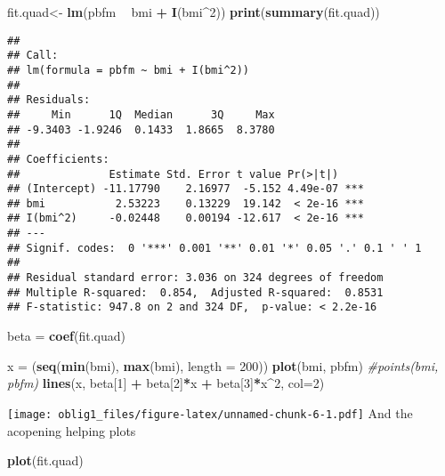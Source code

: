 \documentclass[
]{article}
\newenvironment{Shaded}{\begin{snugshade}}{\end{snugshade}}
\newcommand{\CommentTok}[1]{\textcolor[rgb]{0.56,0.35,0.01}{\textit{#1}}}
\newcommand{\DataTypeTok}[1]{\textcolor[rgb]{0.13,0.29,0.53}{#1}}
\newcommand{\DecValTok}[1]{\textcolor[rgb]{0.00,0.00,0.81}{#1}}
\newcommand{\KeywordTok}[1]{\textcolor[rgb]{0.13,0.29,0.53}{\textbf{#1}}}
\newcommand{\NormalTok}[1]{#1}
\newcommand{\OperatorTok}[1]{\textcolor[rgb]{0.81,0.36,0.00}{\textbf{#1}}}
\newcommand{\StringTok}[1]{\textcolor[rgb]{0.31,0.60,0.02}{#1}}
\begin{document}
\begin{Shaded}
\begin{Highlighting}[]
\NormalTok{fit.quad<-}\StringTok{ }\KeywordTok{lm}\NormalTok{(pbfm }\OperatorTok{~}\StringTok{ }\NormalTok{bmi }\OperatorTok{+}\StringTok{ }\KeywordTok{I}\NormalTok{(bmi}\OperatorTok{^}\DecValTok{2}\NormalTok{))}
\KeywordTok{print}\NormalTok{(}\KeywordTok{summary}\NormalTok{(fit.quad))}
\end{Highlighting}
\end{Shaded}

\begin{verbatim}
## 
## Call:
## lm(formula = pbfm ~ bmi + I(bmi^2))
## 
## Residuals:
##     Min      1Q  Median      3Q     Max 
## -9.3403 -1.9246  0.1433  1.8665  8.3780 
## 
## Coefficients:
##              Estimate Std. Error t value Pr(>|t|)    
## (Intercept) -11.17790    2.16977  -5.152 4.49e-07 ***
## bmi           2.53223    0.13229  19.142  < 2e-16 ***
## I(bmi^2)     -0.02448    0.00194 -12.617  < 2e-16 ***
## ---
## Signif. codes:  0 '***' 0.001 '**' 0.01 '*' 0.05 '.' 0.1 ' ' 1
## 
## Residual standard error: 3.036 on 324 degrees of freedom
## Multiple R-squared:  0.854,  Adjusted R-squared:  0.8531 
## F-statistic: 947.8 on 2 and 324 DF,  p-value: < 2.2e-16
\end{verbatim}

\begin{Shaded}
\begin{Highlighting}[]
\NormalTok{beta =}\StringTok{ }\KeywordTok{coef}\NormalTok{(fit.quad)}

\NormalTok{x =}\StringTok{ }\NormalTok{(}\KeywordTok{seq}\NormalTok{(}\KeywordTok{min}\NormalTok{(bmi), }\KeywordTok{max}\NormalTok{(bmi), }\DataTypeTok{length =} \DecValTok{200}\NormalTok{))}
\KeywordTok{plot}\NormalTok{(bmi, pbfm)}
\CommentTok{#points(bmi, pbfm)}
\KeywordTok{lines}\NormalTok{(x, beta[}\DecValTok{1}\NormalTok{] }\OperatorTok{+}\StringTok{ }\NormalTok{beta[}\DecValTok{2}\NormalTok{]}\OperatorTok{*}\NormalTok{x }\OperatorTok{+}\StringTok{ }\NormalTok{beta[}\DecValTok{3}\NormalTok{]}\OperatorTok{*}\NormalTok{x}\OperatorTok{^}\DecValTok{2}\NormalTok{, }\DataTypeTok{col=}\DecValTok{2}\NormalTok{)}
\end{Highlighting}
\end{Shaded}

\texttt{[image: oblig1\_files/figure-latex/unnamed-chunk-6-1.pdf]} And
the acopening helping plots

\begin{Shaded}
\begin{Highlighting}[]
\KeywordTok{plot}\NormalTok{(fit.quad)}
\end{Highlighting}
\end{Shaded}
\end{document}
